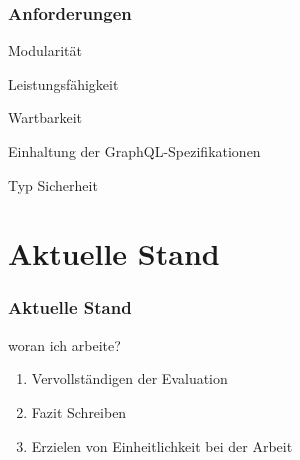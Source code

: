\begin{frame}
    \frametitle{Anforderungen}

    \begin{alertblock}{Modularität}
    \end{alertblock}
    \begin{alertblock}{Leistungsfähigkeit}
    \end{alertblock}
    \begin{alertblock}{Wartbarkeit}
    \end{alertblock}
    \begin{alertblock}{Einhaltung der GraphQL-Spezifikationen}
    \end{alertblock}
    \begin{alertblock}{Typ Sicherheit}
    \end{alertblock}

\end{frame}


\section{Aktuelle Stand}

\begin{frame}{}
    \frametitle{Aktuelle Stand}

    \footnotesize

    \begin{alertblock}{woran ich arbeite?}
        \begin{enumerate}
            \item Vervollständigen der Evaluation
            \item Fazit Schreiben
            \item Erzielen von Einheitlichkeit bei der Arbeit
        \end{enumerate}
    \end{alertblock}


\end{frame}